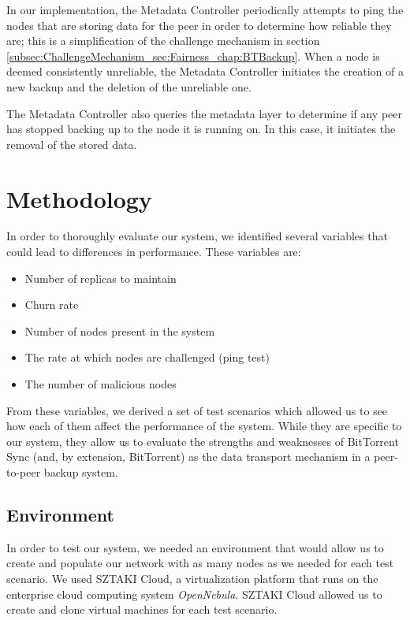 \documentclass[12pt]{report}
\begin{document}
In our implementation, the Metadata Controller periodically attempts to ping the nodes that are storing data for the peer in order to determine how reliable they are; this is a simplification of the challenge mechanism in section \ref{subsec:ChallengeMechanism_sec:Fairness_chap:BTBackup}. When a node is deemed consistently unreliable, the Metadata Controller initiates the creation of a new backup and the deletion of the unreliable one.

The Metadata Controller also queries the metadata layer to determine if any peer has stopped backing up to the node it is running on. In this case, it initiates the removal of the stored data.

\chapter{Methodology}

In order to thoroughly evaluate our system, we identified several variables that could lead to differences in performance. These variables are:

\begin{itemize}
\item Number of replicas to maintain
\item Churn rate
\item Number of nodes present in the system
\item The rate at which nodes are challenged (ping test)
\item The number of malicious nodes
\end{itemize}

From these variables, we derived a set of test scenarios which allowed us to see how each of them affect the performance of the system. While they are specific to our system, they allow us to evaluate the strengths and weaknesses of BitTorrent Sync (and, by extension, BitTorrent) as the data transport mechanism in a peer-to-peer backup system.

\section{Environment}


In order to test our system, we needed an environment that would allow us to create and populate our network with as many nodes as we needed for each test scenario. We used SZTAKI Cloud, a virtualization platform that runs on the enterprise cloud computing system \textit{OpenNebula}. SZTAKI Cloud allowed us to create and clone virtual machines for each test scenario. %
\end{document}
